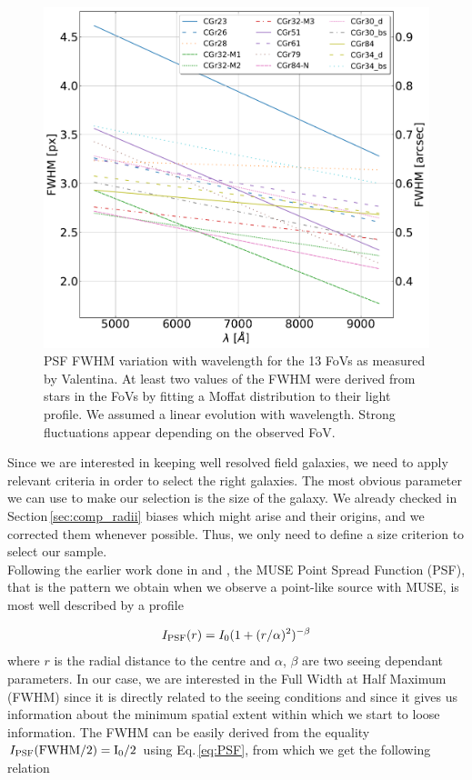 \begin{figure}[t]
	\centering
	\includegraphics[width=\linewidth]{../Plots/FWHM_variation_with_lambda.pdf}
	\caption[PSF FWHM variation with wavelength.]{PSF FWHM variation with wavelength for the 13 FoVs as measured by Valentina. At least two values of the FWHM were derived from stars in the FoVs by fitting a Moffat distribution to their light profile. We assumed a linear evolution with wavelength. Strong fluctuations appear depending on the observed FoV.}
	\label{fig:FWHM_var_lambda}
\end{figure}

Since we are interested in keeping well resolved field galaxies, we need to apply relevant criteria in order to select the right galaxies. The most obvious parameter we can use to make our selection is the size of the galaxy. We already checked  in Section\,\ref{sec:comp_radii} biases which might arise and their origins, and we corrected them whenever possible. Thus, we only need to define a size criterion to select our sample. \\

Following the earlier work done in  and , the MUSE Point Spread Function (PSF), that is the pattern we obtain when we observe a point-like source with MUSE, is most well described by a  profile

\begin{equation}
	I_{\rm{PSF}}(r) = I_0 (1 + (r/\alpha)^2 ) ^{- \beta}
	\label{eq:PSF}
\end{equation}
where $r$ is the radial distance to the centre and $\alpha$, $\beta$ are two seeing dependant parameters. In our case, we are interested in the Full Width at Half Maximum (FWHM) since it is directly related to the seeing conditions and since it gives us information about the minimum spatial extent within which we start to loose information.
The FWHM can be easily derived from the equality $I_{\rm{PSF}} ( \rm{FWHM}/2) = I_0 /2$ using Eq.\,\ref{eq:PSF}, from which we get the following relation

